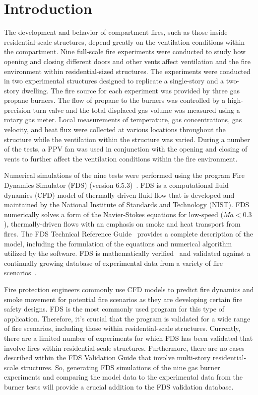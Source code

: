 
\renewcommand{\thechapter}{1}

\chapter{Introduction}
The development and behavior of compartment fires, such as those inside residential-scale structures, depend greatly on the ventilation conditions within the compartment. Nine full-scale fire experiments were conducted to study how opening and closing different doors and other vents affect ventilation and the fire environment within residential-sized structures. The experiments were conducted in two experimental structures designed to replicate a single-story and a two-story dwelling. The fire source for each experiment was provided by three gas propane burners. The flow of propane to the burners was controlled by a high-precision turn valve and the total displaced gas volume was measured using a rotary gas meter. Local measurements of temperature, gas concentrations, gas velocity, and heat flux were collected at various locations throughout the structure while the ventilation within the structure was varied. During a number of the tests, a PPV fan was used in conjunction with the opening and closing of vents to further affect the ventilation conditions within the fire environment.

Numerical simulations of the nine tests were performed using the program Fire Dynamics Simulator (FDS) (version 6.5.3)~\cite{FDS_Users_Guide}. FDS is a computational fluid dynamics (CFD) model of thermally-driven fluid flow that is developed and maintained by the National Institute of Standards and Technology (NIST). FDS numerically solves a form of the Navier-Stokes equations for low-speed ($Ma < 0.3$), thermally-driven flows with an emphasis on smoke and heat transport from fires. The FDS Technical Reference Guide~\cite{FDS_Tech_Guide} provides a complete description of the model, including the formulation of the equations and numerical algorithm utilized by the software. FDS is mathematically verified~\cite{FDS_Verification_Guide} and validated against a continually growing database of experimental data from a variety of fire scenarios~\cite{FDS_Validation_Guide}.

Fire protection engineers commonly use CFD models to predict fire dynamics and smoke movement for potential fire scenarios as they are developing certain fire safety designs. FDS is the most commonly used program for this type of application. Therefore, it's crucial that the program is validated for a wide range of fire scenarios, including those within residential-scale structures. Currently, there are a limited number of experiments for which FDS has been validated that involve fires within residential-scale structures. Furthermore, there are no cases described within the FDS Validation Guide that involve multi-story residential-scale structures. So, generating FDS simulations of the nine gas burner experiments and comparing the model data to the experimental data from the burner tests will provide a crucial addition to the FDS validation database.


